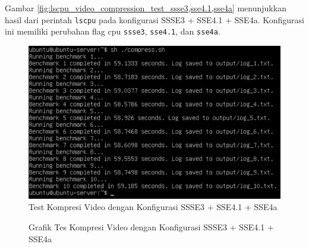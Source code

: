 Gambar \ref{fig:lscpu_video_compression_test_ssse3,sse4.1,sse4a} menunjukkan hasil dari perintah \texttt{lscpu} pada konfigurasi SSSE3 + SSE4.1 + SSE4a. Konfigurasi ini memiliki perubahan flag cpu \texttt{ssse3}, \texttt{sse4.1}, dan \texttt{sse4a}.

\begin{figure}
    \centering
    \includegraphics[width=1\textwidth]
    {assets/pics/video-compression-test/ssse3,sse4.1,sse4a.jpeg}
    \caption{Test Kompresi Video dengan Konfigurasi SSSE3 + SSE4.1 + SSE4a}
    \label{fig:video_compression_test_ssse3,sse4.1,sse4a}
\end{figure}

\begin{figure}
    \centering
    \caption{Grafik Tes Kompresi Video dengan Konfigurasi SSSE3 + SSE4.1 + SSE4a}
    \label{fig:video_compression_test_ssse3,sse4.1,sse4a_graph}
\end{figure}

